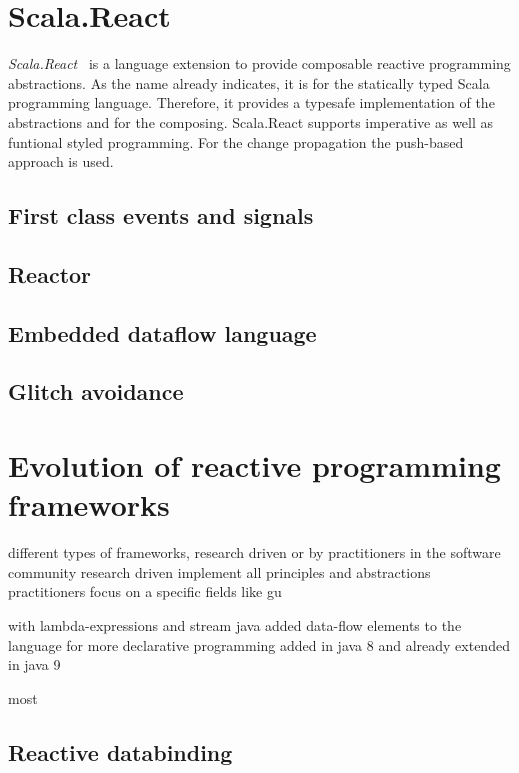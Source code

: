 \documentclass[acmsmall]{acmart}\settopmatter{printfolios=true,printccs=false,printacmref=false}
\begin{document}
\section{Scala.React}
	\textit{Scala.React}~\cite{Maier:2012} is a language extension to provide composable reactive programming abstractions.
	As the name already indicates, it is for the statically typed Scala programming language. 
	Therefore, it provides a typesafe implementation of the abstractions and for the composing. 
	Scala.React supports imperative as well as funtional styled programming.
	For the change propagation the push-based approach is used.

	\subsection{First class events and signals}
	
	\subsection{Reactor}

	\subsection{Embedded dataflow language}

	\subsection{Glitch avoidance}

\section{Evolution of reactive programming frameworks}
	
	different types of frameworks, research driven or by practitioners in the software community
	research driven implement all principles and abstractions
	practitioners focus on a specific fields like gu

	with lambda-expressions and stream java added data-flow elements to the language for more declarative programming
	added in java 8 and already extended in java 9

	most 

	\subsection{Reactive databinding}
\end{document}
